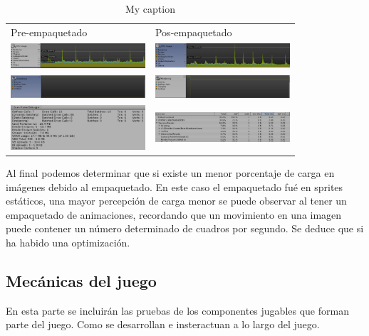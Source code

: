 \begin{table}[]
	\centering
	\caption{My caption}
	\label{my-label}
	\begin{tabular}{ll}
		Pre-empaquetado & Pos-empaquetado \\
	\includegraphics[width=5cm]{04ResultadosObetnidos/pruebaR/imagenes/spritespack/pre/01}	& \includegraphics[width=5cm]{04ResultadosObetnidos/pruebaR/imagenes/spritespack/pos/01}                 \\
	\includegraphics[width=5cm]{04ResultadosObetnidos/pruebaR/imagenes/spritespack/pre/02}	& \includegraphics[width=5cm]{04ResultadosObetnidos/pruebaR/imagenes/spritespack/pos/02}    \\
	\includegraphics[width=5cm]{04ResultadosObetnidos/pruebaR/imagenes/spritespack/pre/03}	& \includegraphics[width=5cm]{04ResultadosObetnidos/pruebaR/imagenes/spritespack/pos/03}       
	    
	\end{tabular}
\end{table}

Al final podemos determinar que si existe un menor porcentaje de carga en imágenes debido al empaquetado. En este caso el empaquetado fué en sprites estáticos, una mayor percepción de carga menor se puede observar al tener un empaquetado de animaciones, recordando que un movimiento en una imagen puede contener un número determinado de cuadros por segundo. Se deduce que si ha habido una optimización.

\subsection{Mecánicas del juego}
En esta parte se incluirán las pruebas de los componentes jugables que forman parte del juego. Como se desarrollan e insteractuan a lo largo del juego.
